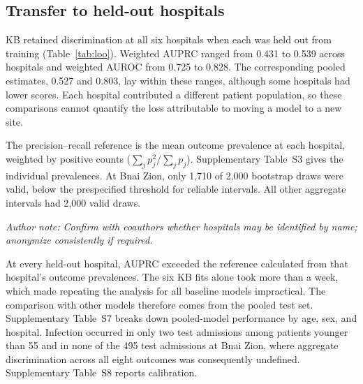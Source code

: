 \subsection{Transfer to held-out hospitals}
KB retained discrimination at all six hospitals when each was held out from training (Table~\ref{tab:loo}). Weighted AUPRC ranged from 0.431 to 0.539 across hospitals and weighted AUROC from 0.725 to 0.828. The corresponding pooled estimates, 0.527 and 0.803, lay within these ranges, although some hospitals had lower scores. Each hospital contributed a different patient population, so these comparisons cannot quantify the loss attributable to moving a model to a new site.

\begin{table}[htbp]
\centering\small
\caption{KB performance when the evaluated hospital is excluded from fitting.}
\label{tab:loo}
\resizebox{\textwidth}{!}{}
\par\smallskip\parbox{\textwidth}{\footnotesize The precision--recall reference is the mean outcome prevalence at each hospital, weighted by positive counts ($\sum_j p_j^2/\sum_j p_j$). Supplementary Table~S3 gives the individual prevalences. At Bnai Zion, only 1,710 of 2,000 bootstrap draws were valid, below the prespecified threshold for reliable intervals. All other aggregate intervals had 2,000 valid draws.}
\end{table}
\noindent\textit{Author note: Confirm with coauthors whether hospitals may be identified by name; anonymize consistently if required.}

At every held-out hospital, AUPRC exceeded the reference calculated from that hospital's outcome prevalences. The six KB fits alone took more than a week, which made repeating the analysis for all baseline models impractical. The comparison with other models therefore comes from the pooled test set. Supplementary Table~S7 breaks down pooled-model performance by age, sex, and hospital. Infection occurred in only two test admissions among patients younger than 55 and in none of the 495 test admissions at Bnai Zion, where aggregate discrimination across all eight outcomes was consequently undefined. Supplementary Table~S8 reports calibration.

